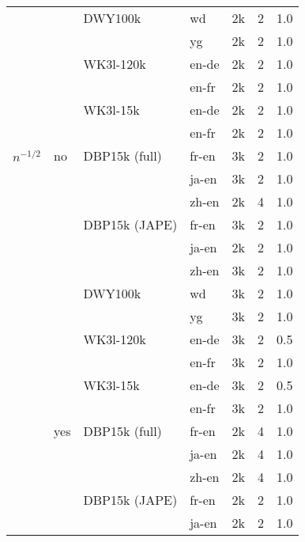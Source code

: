 \documentclass[runningheads]{llncs}
\begin{document}
\begin{table}
\begin{tabular*}{\linewidth}{*{4}{l}*{3}{@{\extracolsep{\fill}}r}@{\extracolsep{\fill}}}
                 &     & DWY100k & wd &         2k &         2 &   1.0 \\
                 &     &         & yg &         2k &         2 &   1.0 \\
                 &     & WK3l-120k & en-de &         2k &         2 &   1.0 \\
                 &     &         & en-fr &         2k &         2 &   1.0 \\
                 &     & WK3l-15k & en-de &         2k &         2 &   1.0 \\
                 &     &         & en-fr &         2k &         2 &   1.0 \\
        $n^{-1/2}$ & no & DBP15k (full) & fr-en &         3k &         2 &   1.0 \\
                 &     &         & ja-en &         3k &         2 &   1.0 \\
                 &     &         & zh-en &         2k &         4 &   1.0 \\
                 &     & DBP15k (JAPE) & fr-en &         3k &         2 &   1.0 \\
                 &     &         & ja-en &         2k &         2 &   1.0 \\
                 &     &         & zh-en &         3k &         2 &   1.0 \\
                 &     & DWY100k & wd &         3k &         2 &   1.0 \\
                 &     &         & yg &         3k &         2 &   1.0 \\
                 &     & WK3l-120k & en-de &         3k &         2 &   0.5 \\
                 &     &         & en-fr &         3k &         2 &   1.0 \\
                 &     & WK3l-15k & en-de &         3k &         2 &   0.5 \\
                 &     &         & en-fr &         3k &         2 &   1.0 \\
                 & yes & DBP15k (full) & fr-en &         2k &         4 &   1.0 \\
                 &     &         & ja-en &         2k &         4 &   1.0 \\
                 &     &         & zh-en &         2k &         4 &   1.0 \\
                 &     & DBP15k (JAPE) & fr-en &         2k &         2 &   1.0 \\
                 &     &         & ja-en &         2k &         2 &   1.0 \\

\end{tabular*}
\end{table}
\end{document}
